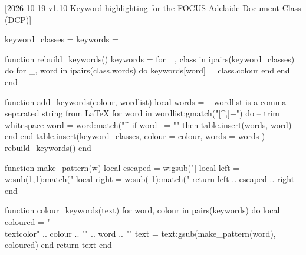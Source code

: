 %
%
% 

[2026-10-19 v1.10
   Keyword highlighting for the FOCUS Adelaide Document Class (DCP)]

\RequirePackage{xcolor}
\RequirePackage{luacode}

\begin{luacode}
  keyword_classes = {}
  keywords = {}

  function rebuild_keywords()
    keywords = {}
    for _, class in ipairs(keyword_classes) do
      for _, word in ipairs(class.words) do
        keywords[word] = class.colour
      end
    end
  end

  function add_keywords(colour, wordlist)
    local words = {}
    -- wordlist is a comma-separated string from LaTeX
    for word in wordlist:gmatch("[^,]+") do
      -- trim whitespace
      word = word:match("^%
      if word ~= "" then
        table.insert(words, word)
      end
    end
    table.insert(keyword_classes, { colour = colour, words = words })
    rebuild_keywords()
  end

  function make_pattern(w)
    local escaped = w:gsub("[%
    local left  = w:sub(1,1):match("%
    local right = w:sub(-1):match("%
    return left .. escaped .. right
  end

  function colour_keywords(text)
    for word, colour in pairs(keywords) do
      local coloured = "\\textcolor{" .. colour .. "}{" .. word .. "}"
      text = text:gsub(make_pattern(word), coloured)
    end
    return text
  end
\end{luacode}

\NewDocumentCommand {}
  {%
  }

\NewDocumentCommand \FOCUSAdlClearKeywords { }
  {%
  }

  {%
  }
  {%
  }

\endinput
